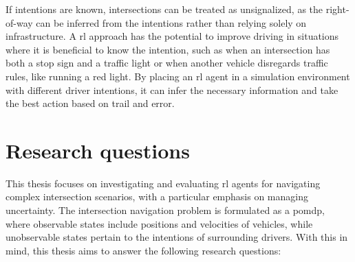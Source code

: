 If intentions are known, intersections can be treated as unsignalized, as the right-of-way can be inferred from the intentions rather than relying solely on infrastructure. A \gls{rl} approach has the potential to improve driving in situations where it is beneficial to know the intention, such as when an intersection has both a stop sign and a traffic light or when another vehicle disregards traffic rules, like running a red light. By placing an \gls{rl} agent in a simulation environment with different driver intentions, it can infer the necessary information and take the best action based on trail and error. 


\section{Research questions}
\label{sec:research_questions}


	

This thesis focuses on investigating and evaluating \gls{rl} agents for navigating complex intersection scenarios, with a particular emphasis on managing uncertainty. 
The intersection navigation problem is formulated as a \gls{pomdp}, where observable states include positions and velocities of vehicles, while unobservable states pertain to the intentions of surrounding drivers. With this in mind, this thesis aims to answer the following research questions:

